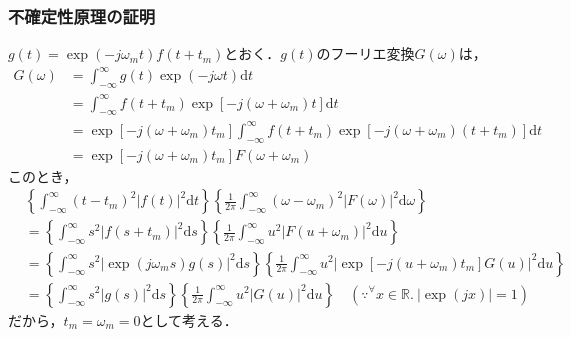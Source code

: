 \documentclass[dvipdfmx,graphicx,14pt]{beamer}
\begin{document}
\begin{frame}[c]
    \frametitle{不確定性原理の証明}
    \scriptsize
    $g(t) = \exp(-j\omega_{m}t) f(t + t_{m})$とおく．$g(t)$のフーリエ変換$G(\omega)$は，
    \begin{align*}
        G(\omega) &= \int^{\infty}_{-\infty} g(t) \exp(-j\omega t) \mathrm{d}t \\
        &= \int^{\infty}_{-\infty} f(t + t_{m}) \exp[-j(\omega + \omega_{m}) t] \mathrm{d}t \\
        &= \exp[-j(\omega + \omega_{m}) t_{m}] \int^{\infty}_{-\infty} f(t + t_{m}) \exp[-j(\omega + \omega_{m}) (t + t_{m})] \mathrm{d}t \\
        &= \exp[-j(\omega + \omega_{m}) t_{m}] F(\omega + \omega_{m})
    \end{align*}
    このとき，
    \begin{align*}
        & \left\{ \int_{-\infty}^{\infty} (t - t_{m})^{2} |f(t)|^{2} \mathrm{d}t \right\} \left\{ \frac{1}{2\pi} \int_{-\infty}^{\infty} (\omega - \omega_{m})^{2} |F(\omega)|^{2} \mathrm{d}\omega \right\} \\
        &= \left\{ \int_{-\infty}^{\infty} s^{2} |f(s + t_{m})|^{2} \mathrm{d}s \right\} \left\{ \frac{1}{2\pi} \int_{-\infty}^{\infty} u^{2} |F(u + \omega_{m})|^{2} \mathrm{d}u \right\} \\
        &= \left\{ \int_{-\infty}^{\infty} s^{2} |\exp(j\omega_{m}s)g(s)|^{2} \mathrm{d}s \right\} \left\{ \frac{1}{2\pi} \int_{-\infty}^{\infty} u^{2} |\exp[-j(u+\omega_{m})t_{m}]G(u)|^{2} \mathrm{d}u \right\} \\
        &= \left\{ \int_{-\infty}^{\infty} s^{2} |g(s)|^{2} \mathrm{d}s \right\} \left\{ \frac{1}{2\pi} \int_{-\infty}^{\infty} u^{2} |G(u)|^{2} \mathrm{d}u \right\} \quad (\because {}^{\forall} x \in \mathbb{R}.\ |\exp(jx)| = 1)
    \end{align*}
    だから，$t_{m} = \omega_{m} = 0$として考える．
\end{frame}
\end{document}
